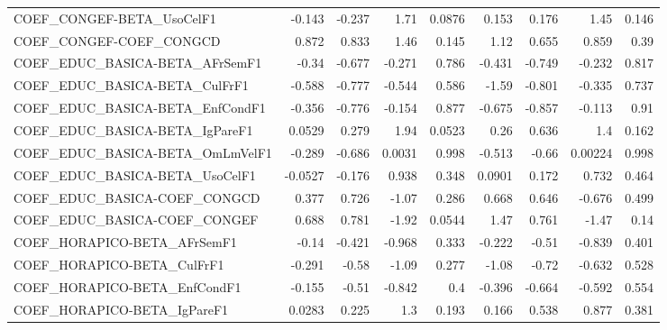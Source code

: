 \begin{tabular}{lrrrrrrrr}
COEF\_CONGEF-BETA\_UsoCelF1             &      -0.143 &       -0.237 &    1.71 &   0.0876 &      0.153 &       0.176 &         1.45 &         0.146 \\
COEF\_CONGEF-COEF\_CONGCD               &       0.872 &        0.833 &    1.46 &    0.145 &       1.12 &       0.655 &        0.859 &          0.39 \\
COEF\_EDUC\_BASICA-BETA\_AFrSemF1        &       -0.34 &       -0.677 &  -0.271 &    0.786 &     -0.431 &      -0.749 &       -0.232 &         0.817 \\
COEF\_EDUC\_BASICA-BETA\_CulFrF1         &      -0.588 &       -0.777 &  -0.544 &    0.586 &      -1.59 &      -0.801 &       -0.335 &         0.737 \\
COEF\_EDUC\_BASICA-BETA\_EnfCondF1       &      -0.356 &       -0.776 &  -0.154 &    0.877 &     -0.675 &      -0.857 &       -0.113 &          0.91 \\
COEF\_EDUC\_BASICA-BETA\_IgPareF1        &      0.0529 &        0.279 &    1.94 &   0.0523 &       0.26 &       0.636 &          1.4 &         0.162 \\
COEF\_EDUC\_BASICA-BETA\_OmLmVelF1       &      -0.289 &       -0.686 &  0.0031 &    0.998 &     -0.513 &       -0.66 &      0.00224 &         0.998 \\
COEF\_EDUC\_BASICA-BETA\_UsoCelF1        &     -0.0527 &       -0.176 &   0.938 &    0.348 &     0.0901 &       0.172 &        0.732 &         0.464 \\
COEF\_EDUC\_BASICA-COEF\_CONGCD          &       0.377 &        0.726 &   -1.07 &    0.286 &      0.668 &       0.646 &       -0.676 &         0.499 \\
COEF\_EDUC\_BASICA-COEF\_CONGEF          &       0.688 &        0.781 &   -1.92 &   0.0544 &       1.47 &       0.761 &        -1.47 &          0.14 \\
COEF\_HORAPICO-BETA\_AFrSemF1           &       -0.14 &       -0.421 &  -0.968 &    0.333 &     -0.222 &       -0.51 &       -0.839 &         0.401 \\
COEF\_HORAPICO-BETA\_CulFrF1            &      -0.291 &        -0.58 &   -1.09 &    0.277 &      -1.08 &       -0.72 &       -0.632 &         0.528 \\
COEF\_HORAPICO-BETA\_EnfCondF1          &      -0.155 &        -0.51 &  -0.842 &      0.4 &     -0.396 &      -0.664 &       -0.592 &         0.554 \\
COEF\_HORAPICO-BETA\_IgPareF1           &      0.0283 &        0.225 &     1.3 &    0.193 &      0.166 &       0.538 &        0.877 &         0.381 \\

\end{tabular}
